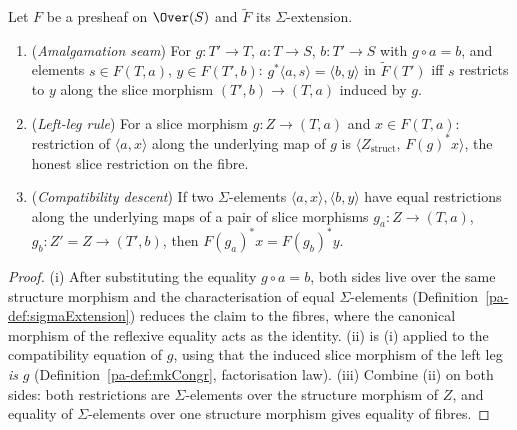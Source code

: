 \begin{lemma}
  \label{pa-lem:sigmaExtension_seams}
  \leanok

  Let \(F\) be a presheaf on \(\Over(S)\) and \(\widetilde F\) its \(\Sigma\)-extension.
  \begin{enumerate}
  \item (\emph{Amalgamation seam}) For \(g \colon T' \to T\), \(a \colon T \to S\),
    \(b \colon T' \to S\) with \(g \circ a = b\), and elements \(s \in F(T,a)\),
    \(y \in F(T',b)\):
    \(g^{*}\langle a, s\rangle = \langle b, y\rangle\) in \(\widetilde F(T')\) iff
    \(s\) restricts to \(y\) along the slice morphism \((T',b) \to (T,a)\) induced by \(g\).
  \item (\emph{Left-leg rule}) For a slice morphism \(g \colon Z \to (T,a)\) and
    \(x \in F(T,a)\): restriction of \(\langle a, x\rangle\) along the underlying map of
    \(g\) is \(\langle Z_{\mathrm{struct}},\, F(g)^{*}x \rangle\), the honest slice
    restriction on the fibre.
  \item (\emph{Compatibility descent}) If two \(\Sigma\)-elements
    \(\langle a, x\rangle, \langle b, y\rangle\) have equal restrictions along the
    underlying maps of a pair of slice morphisms \(g_a \colon Z \to (T,a)\),
    \(g_b \colon Z' = Z \to (T',b)\), then \(F(g_a)^{*}x = F(g_b)^{*}y\).
  \end{enumerate}
\end{lemma}
\begin{proof}
  \leanok
  (i) After substituting the equality \(g \circ a = b\), both sides live over the same
  structure morphism and the characterisation of equal \(\Sigma\)-elements
  (Definition~\ref{pa-def:sigmaExtension}) reduces the claim to the fibres, where the canonical
  morphism of the reflexive equality acts as the identity. (ii) is (i) applied to the
  compatibility equation of \(g\), using that the induced slice morphism of the left leg
  \emph{is} \(g\) (Definition~\ref{pa-def:mkCongr}, factorisation law). (iii) Combine (ii) on
  both sides: both restrictions are \(\Sigma\)-elements over the structure morphism of
  \(Z\), and equality of \(\Sigma\)-elements over one structure morphism gives equality of
  fibres.
\end{proof}


